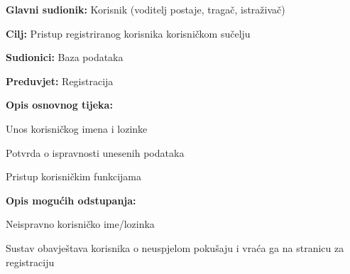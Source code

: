 					


					\noindent {}
					\begin{packed_item}
	
						\item \textbf{Glavni sudionik: }Korisnik (voditelj postaje, tragač, istraživač)
						\item  \textbf{Cilj:} Pristup registriranog korisnika korisničkom sučelju
						\item  \textbf{Sudionici:} Baza podataka
						\item  \textbf{Preduvjet:} Registracija
						\item  \textbf{Opis osnovnog tijeka:} 
						
						
						\item[] \begin{packed_enum}
	
							\item Unos korisničkog imena i lozinke							
							\item Potvrda o ispravnosti unesenih podataka
							\item Pristup korisničkim funkcijama
							
						\end{packed_enum}
						
						\item  \textbf{Opis mogućih odstupanja:}
						
						\item[] \begin{packed_item}
	
							\item[2.a] Neispravno korisničko ime/lozinka
							\item[] \begin{packed_enum}
								
								\item Sustav obavještava korisnika o neuspjelom pokušaju i vraća ga na stranicu za registraciju 
								
							\end{packed_enum}
							
						\end{packed_item}
					\end{packed_item}
					
